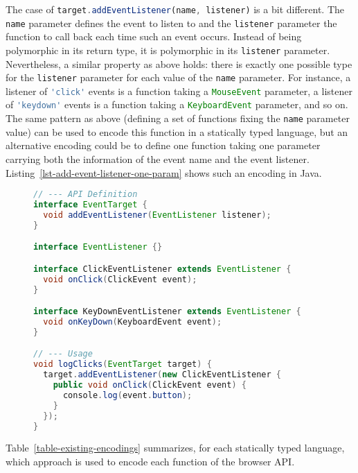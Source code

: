 \documentclass{llncs}
\newcommand{\jscode}[1]{\lstinline[language=JavaScript]|#1|}
\begin{document}
The case of \jscode{target.addEventListener(name, listener)} is a bit different. The \jscode{name} parameter defines the event to listen to and the \jscode{listener} parameter the function to call back each time such an event occurs. Instead of being polymorphic in its return type, it is polymorphic in its \jscode{listener} parameter. Nevertheless, a similar property as above holds: there is exactly one possible type for the \jscode{listener} parameter for each value of the \jscode{name} parameter. For instance, a listener of \jscode{'click'} events is a function taking a \jscode{MouseEvent} parameter, a listener of \jscode{'keydown'} events is a function taking a \jscode{KeyboardEvent} parameter, and so on. The same pattern as above (defining a set of functions fixing the \jscode{name} parameter value) can be used to encode this function in a statically typed language, but an alternative encoding could be to define one function taking one parameter carrying both the information of the event name and the 
event listener. Listing~\ref{lst-add-event-listener-one-param} shows such an encoding in Java.

\begin{figure}
\begin{lstlisting}[label=lst-add-event-listener-one-param,language=Java,caption={Encoding of the \jscode{target.addEventListener(name, listener)} function in Java using one paremeter carrying both the information of the event name and the event listener}]
// --- API Definition
interface EventTarget {
  void addEventListener(EventListener listener);
}

interface EventListener {}

interface ClickEventListener extends EventListener {
  void onClick(ClickEvent event);
}

interface KeyDownEventListener extends EventListener {
  void onKeyDown(KeyboardEvent event);
}

// --- Usage
void logClicks(EventTarget target) {
  target.addEventListener(new ClickEventListener {
    public void onClick(ClickEvent event) {
      console.log(event.button);
    }
  });
}
\end{lstlisting}
\end{figure}

Table~\ref{table-existing-encodings} summarizes, for each statically typed language, which approach is used to encode each function of the browser API.
\end{document}
